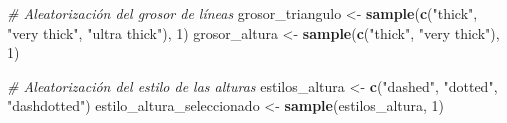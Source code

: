 \documentclass[
]{article}
\newenvironment{Shaded}{\begin{snugshade}}{\end{snugshade}}
\newcommand{\CommentTok}[1]{\textcolor[rgb]{0.56,0.35,0.01}{\textit{#1}}}
\newcommand{\DecValTok}[1]{\textcolor[rgb]{0.00,0.00,0.81}{#1}}
\newcommand{\FunctionTok}[1]{\textcolor[rgb]{0.13,0.29,0.53}{\textbf{#1}}}
\newcommand{\NormalTok}[1]{#1}
\newcommand{\OtherTok}[1]{\textcolor[rgb]{0.56,0.35,0.01}{#1}}
\newcommand{\StringTok}[1]{\textcolor[rgb]{0.31,0.60,0.02}{#1}}
\begin{document}
\begin{Shaded}
\begin{Highlighting}[]
\CommentTok{\# Aleatorización del grosor de líneas}
\NormalTok{grosor\_triangulo }\OtherTok{\textless{}{-}} \FunctionTok{sample}\NormalTok{(}\FunctionTok{c}\NormalTok{(}\StringTok{"thick"}\NormalTok{, }\StringTok{"very thick"}\NormalTok{, }\StringTok{"ultra thick"}\NormalTok{), }\DecValTok{1}\NormalTok{)}
\NormalTok{grosor\_altura }\OtherTok{\textless{}{-}} \FunctionTok{sample}\NormalTok{(}\FunctionTok{c}\NormalTok{(}\StringTok{"thick"}\NormalTok{, }\StringTok{"very thick"}\NormalTok{), }\DecValTok{1}\NormalTok{)}

\CommentTok{\# Aleatorización del estilo de las alturas}
\NormalTok{estilos\_altura }\OtherTok{\textless{}{-}} \FunctionTok{c}\NormalTok{(}\StringTok{"dashed"}\NormalTok{, }\StringTok{"dotted"}\NormalTok{, }\StringTok{"dashdotted"}\NormalTok{)}
\NormalTok{estilo\_altura\_seleccionado }\OtherTok{\textless{}{-}} \FunctionTok{sample}\NormalTok{(estilos\_altura, }\DecValTok{1}\NormalTok{)}
\end{Highlighting}
\end{Shaded}
\end{document}
